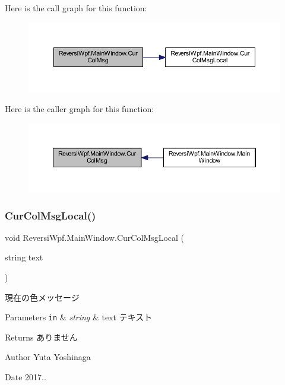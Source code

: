 Here is the call graph for this function\+:\nopagebreak
\begin{figure}[H]
\begin{center}
\leavevmode
\includegraphics[width=350pt]{class_reversi_wpf_1_1_main_window_a5dd2bbfd5f17c36d1b301fdb91b483ad_cgraph}
\end{center}
\end{figure}
Here is the caller graph for this function\+:\nopagebreak
\begin{figure}[H]
\begin{center}
\leavevmode
\includegraphics[width=350pt]{class_reversi_wpf_1_1_main_window_a5dd2bbfd5f17c36d1b301fdb91b483ad_icgraph}
\end{center}
\end{figure}
\mbox{\label{class_reversi_wpf_1_1_main_window_a92d45fe8b0224e36ce974e04388ec541}} 
\subsubsection{\texorpdfstring{Cur\+Col\+Msg\+Local()}{CurColMsgLocal()}}
{\footnotesize\ttfamily void Reversi\+Wpf.\+Main\+Window.\+Cur\+Col\+Msg\+Local (\begin{DoxyParamCaption}\item[{string}]{text }\end{DoxyParamCaption})}



現在の色メッセージ 


\begin{DoxyParams}[1]{Parameters}
\mbox{\tt in}  & {\em string} & text テキスト \\
\hline
\end{DoxyParams}
\begin{DoxyReturn}{Returns}
ありません 
\end{DoxyReturn}
\begin{DoxyAuthor}{Author}
Yuta Yoshinaga 
\end{DoxyAuthor}
\begin{DoxyDate}{Date}
2017.. 
\end{DoxyDate}


